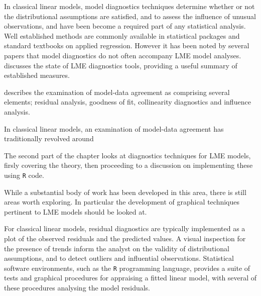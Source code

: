 \documentclass[12pt, a4paper]{report}
\theoremstyle{plain}
\theoremstyle{definition}
\theoremstyle{remark}
\begin{document}
			In classical linear models, model diagnostics techniques determine whether or not the distributional assumptions are satisfied, and to assess the influence of unusual observations, and have been become a required part of any statistical analysis. Well established methods are commonly available in statistical packages and standard textbooks on applied regression. However it has been noted by several papers that model diagnostics do not often accompany LME model analyses. \citet{schabenberger} discusses the state of LME diagnostics tools, providing a useful summary of established measures.
			
			\citet{schabenberger} describes the examination of model-data agreement as comprising several elements; residual analysis, goodness of fit, collinearity diagnostics and influence analysis.
			
			
			In classical linear models, an examination of model-data agreement has traditionally revolved around
			
			The second part of the chapter looks at diagnostics techniques for LME models, firsly covering the theory, then proceeding to a discussion on 
			implementing these using \texttt{R} code.
			
			While a substantial body of work has been developed in this area, there is still areas worth exploring. 
			In particular the development of graphical techniques pertinent to LME models should be looked at.
			
	
			
	
		
		For classical linear models, residual diagnostics are typically implemented as a plot of the observed residuals and the predicted values. A visual inspection for the presence of trends inform the analyst on the validity of distributional assumptions, and to detect outliers and influential observations. Statistical software environments, such as the \texttt{R} programming language, provides a suite of tests and graphical procedures for appraising a fitted linear model, with several 
		of these procedures analysing the model residuals.
		
	
	
	
	
\end{document}
